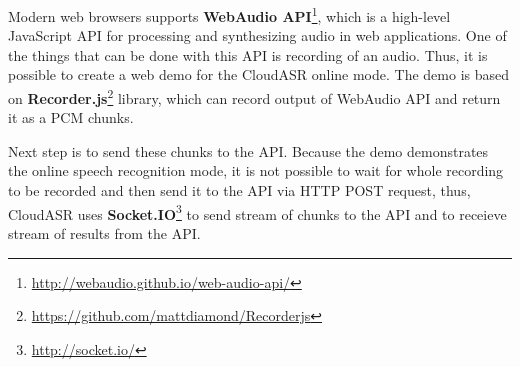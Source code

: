 Modern web browsers supports \textbf{WebAudio API}\footnote{\url{http://webaudio.github.io/web-audio-api/}},
  which is a high-level JavaScript API for processing and synthesizing audio in web applications.
One of the things that can be done with this API is recording of an audio.
Thus, it is possible to create a web demo for the CloudASR online mode.
The demo is based on \textbf{Recorder.js}\footnote{\url{https://github.com/mattdiamond/Recorderjs}} library,
  which can record output of WebAudio API and return it as a PCM chunks.

Next step is to send these chunks to the API.
Because the demo demonstrates the online speech recognition mode,
  it is not possible to wait for whole recording to be recorded and then send it to the API via HTTP POST request,
  thus, CloudASR uses \textbf{Socket.IO}\footnote{\url{http://socket.io/}} to send stream of chunks to the API
  and to receieve stream of results from the API.


